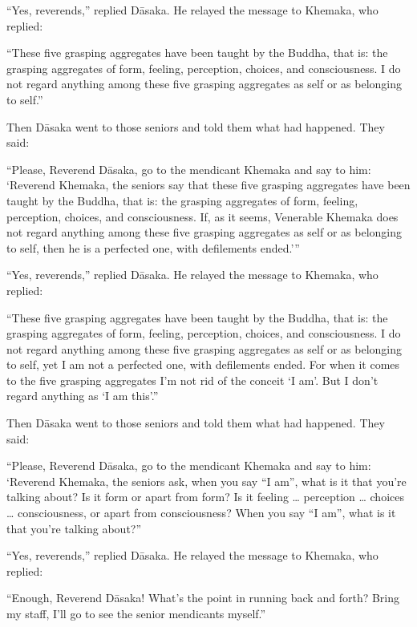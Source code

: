 \documentclass[12pt,openany]{book}%
\begin{document}
“Yes, reverends,” replied \textsanskrit{Dāsaka}. He relayed the message to Khemaka, who replied: 

“These five grasping aggregates have been taught by the Buddha, that is: the grasping aggregates of form, feeling, perception, choices, and consciousness. I do not regard anything among these five grasping aggregates as self or as belonging to self.” 

Then \textsanskrit{Dāsaka} went to those seniors and told them what had happened. They said: 

“Please, Reverend \textsanskrit{Dāsaka}, go to the mendicant Khemaka and say to him: ‘Reverend Khemaka, the seniors say that these five grasping aggregates have been taught by the Buddha, that is: the grasping aggregates of form, feeling, perception, choices, and consciousness. If, as it seems, Venerable Khemaka does not regard anything among these five grasping aggregates as self or as belonging to self, then he is a perfected one, with defilements ended.’” 

“Yes, reverends,” replied \textsanskrit{Dāsaka}. He relayed the message to Khemaka, who replied: 

“These five grasping aggregates have been taught by the Buddha, that is: the grasping aggregates of form, feeling, perception, choices, and consciousness. I do not regard anything among these five grasping aggregates as self or as belonging to self, yet I am not a perfected one, with defilements ended. For when it comes to the five grasping aggregates I’m not rid of the conceit ‘I am’. But I don’t regard anything as ‘I am this’.” 

Then \textsanskrit{Dāsaka} went to those seniors and told them what had happened. They said: 

“Please, Reverend \textsanskrit{Dāsaka}, go to the mendicant Khemaka and say to him: ‘Reverend Khemaka, the seniors ask, when you say “I am”, what is it that you’re talking about? Is it form or apart from form? Is it feeling … perception … choices … consciousness, or apart from consciousness? When you say “I am”, what is it that you’re talking about?” 

“Yes, reverends,” replied \textsanskrit{Dāsaka}. He relayed the message to Khemaka, who replied: 

“Enough, Reverend \textsanskrit{Dāsaka}! What’s the point in running back and forth? Bring my staff, I’ll go to see the senior mendicants myself.” 
\end{document}
